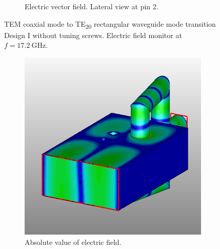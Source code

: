 \documentclass[english,twoside]{article}
\begin{document}
\begin{landscape}
\begin{figure}
\begin{subfigure}[b]{0.4\textwidth}
					\caption{Electric vector field. Lateral view at pin 2.}
				\end{subfigure}
				\caption{TEM coaxial mode to TE\textsubscript{20} rectangular waveguide mode transition Design I without tuning screws. Electric field monitor at $f=\SI{17.2}{\giga\hertz}$.}
        \label{fig:coaxToWrTE20_field}
			\end{figure}
		\end{landscape}
	
			
		\newpage
		\begin{landscape}
			\begin{figure}
				\centering
				\begin{subfigure}[b]{0.4\textwidth}
					\includegraphics[width=\textwidth]{figures/coaxToWrTE20_screw_abs}
					\caption{Absolute value of electric field.}
				\end{subfigure}
				~
				\begin{subfigure}[b]{0.4\textwidth}

\end{subfigure}
\end{figure}
\end{landscape}
\end{document}
